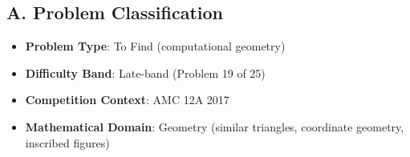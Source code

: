 \documentclass[]{article}
\begin{document}
\begin{problemconfigbox}
\subsection*{A. Problem Classification}
\begin{itemize}[leftmargin=*]
    \item \textbf{Problem Type}: To Find (computational geometry)
    \item \textbf{Difficulty Band}: Late-band (Problem 19 of 25)
    \item \textbf{Competition Context}: AMC 12A 2017
    \item \textbf{Mathematical Domain}: Geometry (similar triangles, coordinate geometry, inscribed figures)
\end{itemize}


\end{problemconfigbox}
\end{document}
